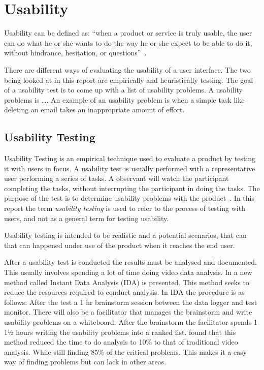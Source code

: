 \section{Usability}
\label{sub:usability}

Usability can be defined as: \enquote{when a product or service is truly usable, the user can do what he or she wants to do the way he or she expect to be able to do it, without hindrance, hesitation, or questions}~\cite{RubinChisnellSpool08}.

There are different ways of evaluating the usability of a user interface. The two being looked at in this report are empirically and heuristically testing. The goal of a usability test is to come up with a list of usability problems. A usability problems is \dots {}. An example of an usability problem is when a simple task like deleting an email takes an inappropriate amount of effort.

\subsection{Usability Testing}
Usability Testing is an empirical technique used to evaluate a product by testing it with users in focus. A usability test is usually performed with a representative user performing a series of tasks. A observant will watch the participant completing the tasks, without interrupting the participant in doing the tasks. The purpose of the test is to determine usability problems with the product~\cite{RubinChisnellSpool08}. In this report the term \emph{usability testing} is used to refer to the process of testing with users, and not as a general term for testing usability. 

Usability testing is intended to be realistic and a potential scenarios, that can that can happened under use of the product when it reaches the end user.

After a usability test is conducted the results must be analysed and documented. This usually involves spending a lot of time doing video data analysis. In \cite{kjeldskov2004instant} a new method called Instant Data Analysis (IDA) is presented. This method seeks to reduce the resources required to conduct analysis. In IDA the procedure is as follows: After the test a 1 hr brainstorm session between the data logger and test monitor. There will also be a facilitator that manages the brainstorm and write usability problems on a whiteboard. After the brainstorm the facilitator spends 1-1½ hours writing the usability problems into a ranked list. \cite{kjeldskov2004instant} found that this method reduced the time to do analysis to 10\% to that of traditional video analysis. While still finding 85\% of the critical problems. This makes it a easy way of finding problems but can lack in other areas.

